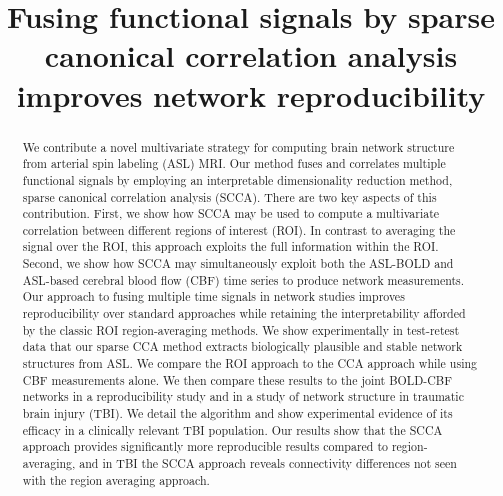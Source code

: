 \documentclass{llncs}
\title{Fusing functional signals by sparse canonical correlation analysis improves network reproducibility}
\begin{document}
\maketitle
\begin{abstract}
We contribute a novel multivariate strategy for computing brain network structure from arterial spin labeling (ASL) MRI.  Our method fuses and correlates multiple functional signals by employing an interpretable dimensionality reduction method, sparse canonical correlation analysis (SCCA).  There are two key aspects of this contribution.  First, we show how SCCA may be used to compute a multivariate correlation between different regions of interest (ROI).  In contrast to averaging the signal over the ROI, this approach exploits the full information within the ROI.  Second, we show how SCCA may simultaneously exploit both the ASL-BOLD and ASL-based cerebral blood flow (CBF) time series to produce network measurements.  Our approach to fusing multiple time signals in network studies improves reproducibility over standard approaches while retaining the interpretability afforded by the classic ROI region-averaging methods.  We show experimentally in test-retest data that our sparse CCA method extracts biologically plausible and stable network structures from ASL.  We compare the ROI approach to the CCA approach while using CBF measurements alone.  We then compare these results to the joint BOLD-CBF networks in a reproducibility study and in a study of network structure in traumatic brain injury (TBI).  We detail the algorithm and show experimental evidence of its efficacy in a clinically relevant TBI population.  Our results show that the SCCA approach provides significantly more reproducible results compared to region-averaging, and in TBI the SCCA approach reveals connectivity differences not seen with the region averaging approach.
\end{abstract}
\end{document}
